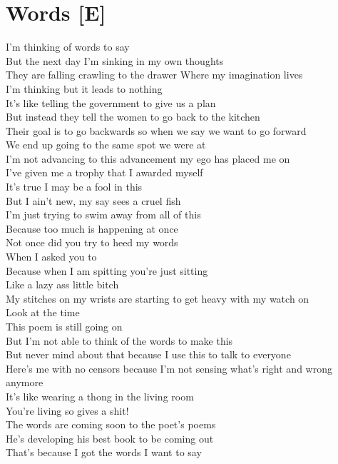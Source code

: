 \documentclass[12pt, b5paper, oneside]{book}
\begin{document}
\section{Words [E]}
I'm thinking of words to say
\\But the next day I'm sinking in my own thoughts
\\They are falling crawling to the drawer Where my imagination lives
\\I'm thinking but it leads to nothing
\\It's like telling the government to give us a plan
\\But instead they tell the women to go back to the kitchen
\\Their goal is to go backwards so when we say we want to go forward
\\We end up going to the same spot we were at
\\I'm not advancing to this advancement my ego has placed me on
\\I've given me a trophy that I awarded myself
\\It's true I may be a fool in this
\\But I ain't new, my say sees a cruel fish
\\I'm just trying to swim away from all of this
\\Because too much is happening at once
\\Not once did you try to heed my words
\\When I asked you to
\\Because when I am spitting you're just sitting
\\Like a lazy ass little bitch
\\My stitches on my wrists are starting to get heavy with my watch on
\\Look at the time
\\This poem is still going on
\\But I'm not able to think of the words to make this
\\But never mind about that because I use this to talk to everyone
\\Here's me with no censors because I'm not sensing what's right and wrong anymore
\\It's like wearing a thong in the living room
\\You're living so gives a shit!
\\The words are coming soon to the poet's poems
\\He's developing his best book to be coming out
\\That's because I got the words I want to say
\end{document}
